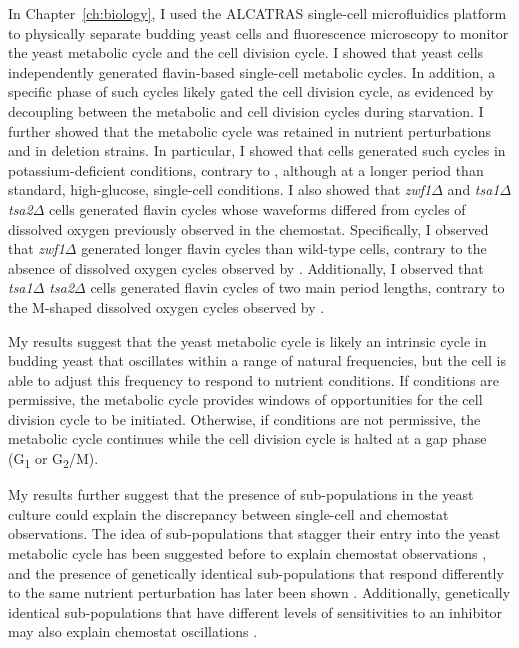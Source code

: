 In Chapter~\ref{ch:biology}, I used the ALCATRAS \parencite{craneMicrofluidicSystemStudying2014} single-cell microfluidics platform to physically separate budding yeast cells and fluorescence microscopy to monitor the yeast metabolic cycle and the cell division cycle.
I showed that yeast cells independently generated flavin-based single-cell metabolic cycles.
In addition, a specific phase of such cycles likely gated the cell division cycle, as evidenced by decoupling between the metabolic and cell division cycles during starvation.
I further showed that the metabolic cycle was retained in nutrient perturbations and in deletion strains.
In particular, I showed that cells generated such cycles in potassium-deficient conditions, contrary to \textcite{oneillEukaryoticCellBiology2020}, although at a longer period than standard, high-glucose, single-cell conditions.
I also showed that \textit{zwf1$\Delta$} and \textit{tsa1$\Delta$ tsa2$\Delta$} cells generated flavin cycles whose waveforms differed from cycles of dissolved oxygen previously observed in the chemostat.
Specifically, I observed that \textit{zwf1$\Delta$} generated longer flavin cycles than wild-type cells, contrary to the absence of dissolved oxygen cycles observed by \textcite{tuCyclicChangesMetabolic2007}.
Additionally, I observed that \textit{tsa1$\Delta$ tsa2$\Delta$} cells generated flavin cycles of two main period lengths, contrary to the M-shaped dissolved oxygen cycles observed by \textcite{caustonMetabolicCyclesYeast2015}.

My results suggest that the yeast metabolic cycle is likely an intrinsic cycle in budding yeast that oscillates within a range of natural frequencies, but the cell is able to adjust this frequency to respond to nutrient conditions.
If conditions are permissive, the metabolic cycle provides windows of opportunities for the cell division cycle to be initiated.
Otherwise, if conditions are not permissive, the metabolic cycle continues while the cell division cycle is halted at a gap phase (G\textsubscript{1} or G\textsubscript{2}/M).

My results further suggest that the presence of sub-populations in the yeast culture could explain the discrepancy between single-cell and chemostat observations.
The idea of sub-populations that stagger their entry into the yeast metabolic cycle has been suggested before to explain chemostat observations \parencite{burnettiCellCycleStart2016}, and the presence of genetically identical sub-populations that respond differently to the same nutrient perturbation has later been shown \parencite{bagameryPutativeBetHedgingStrategy2020}.
Additionally, genetically identical sub-populations that have different levels of sensitivities to an inhibitor may also explain chemostat oscillations \parencite{smithTheoryChemostatDynamics1995}.

